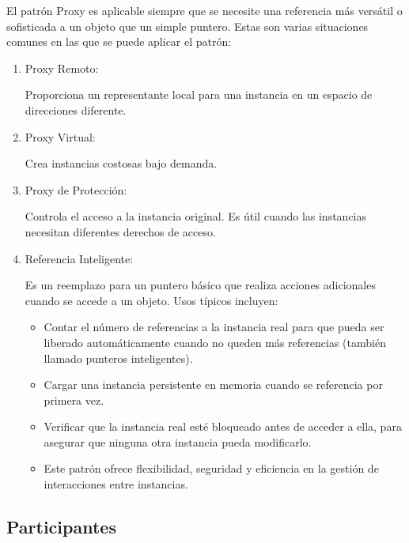 El patrón Proxy es aplicable siempre que se necesite una referencia más versátil o sofisticada a un objeto que un simple puntero. Estas son varias situaciones comunes en las que se puede aplicar el patrón:

\begin{enumerate}
\item Proxy Remoto:

Proporciona un representante local para una instancia en un espacio de direcciones diferente.

\item Proxy Virtual:

Crea instancias costosas bajo demanda.

\item Proxy de Protección:

Controla el acceso a la instancia original.
Es útil cuando las instancias necesitan diferentes derechos de acceso.

\item Referencia Inteligente:

Es un reemplazo para un puntero básico que realiza acciones adicionales cuando se accede a un objeto.
Usos típicos incluyen:

\begin{itemize}
\item Contar el número de referencias a la instancia real para que pueda ser liberado automáticamente cuando no queden más referencias (también llamado punteros inteligentes).
\item Cargar una instancia persistente en memoria cuando se referencia por primera vez.
\item Verificar que la instancia real esté bloqueado antes de acceder a ella, para asegurar que ninguna otra instancia pueda modificarlo.
\item 
Este patrón ofrece flexibilidad, seguridad y eficiencia en la gestión de interacciones entre instancias.
\end{itemize}

\end{enumerate}


\subsection*{Participantes}

